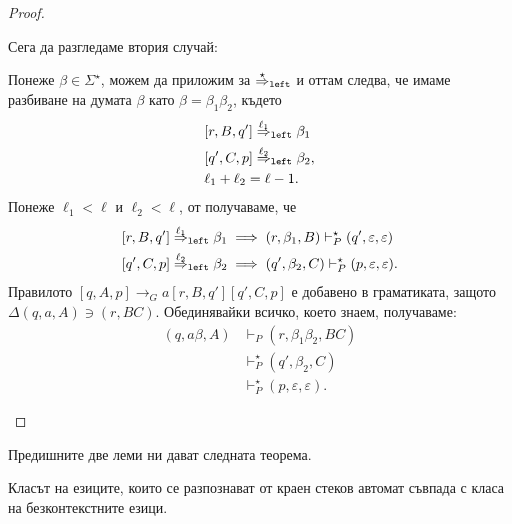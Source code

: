 \begin{proof}
\begin{description}
\begin{itemize}
      Сега да разгледаме втория случай:
      \begin{prooftree}
      \end{prooftree}
      Понеже $\beta \in \Sigma^\star$, можем да приложим  за $\lderive{\star}$ и оттам следва,
      че имаме разбиване на думата $\beta$ като $\beta = \beta_1\beta_2$, където 
      \begin{align*}
        & [r,B,q'] \lderive{\ell_1} \beta_1\\
        & [q',C,p] \lderive{\ell_2} \beta_2,\\
        & \ell_1 + \ell_2 = \ell - 1.
      \end{align*}
      Понеже $\ell_1 < \ell$ и $\ell_2 < \ell$, от \IndHyp получаваме, че 
      \begin{align*}
        & [r,B,q'] \lderive{\ell_1} \beta_1 \implies (r,\beta_1,B) \vdash^\star_P (q',\varepsilon,\varepsilon) \\
        & [q',C,p] \lderive{\ell_2} \beta_2 \implies (q',\beta_2,C) \vdash^\star_P (p,\varepsilon,\varepsilon).
      \end{align*}
      Правилото $[q,A,p] \rightarrow_G a[r,B,q'][q',C,p]$ 
      е добавено в граматиката, защото $\Delta(q,a,A) \ni (r, BC)$. 
      Обединявайки всичко, което знаем, получаваме:
      \begin{align*}
        (q, a\beta, A) & \vdash_P (r, \beta_1\beta_2, BC)\\
                       & \vdash^\star_P (q', \beta_2, C)\\
                       & \vdash^\star_P (p, \varepsilon, \varepsilon).
      \end{align*}    
    \end{itemize}
  \end{description}
\end{proof}

Предишните две леми ни дават следната теорема.
\begin{important}
  \begin{theorem}
    \label{th:push-down-context-free}
    Класът на езиците, които се разпознават от краен стеков автомат съвпада с
    класа на безконтекстните езици.
  \end{theorem}
\end{important}

